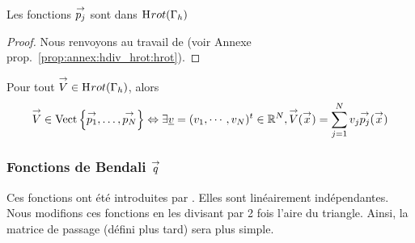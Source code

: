       \begin{prop}
        Les fonctions \({\overset{\rightarrow}{p_j}}\) sont dans \(\mathrm{H}_\mathrm{{}}{rot}(\Gamma_h)\)
      \end{prop}
      \begin{proof}
        Nous renvoyons au travail de \cite{nedelec_mixed_1980} (voir Annexe prop.~\ref{prop:annex:hdiv_hrot:hrot}).
      \end{proof}


      \begin{defn}
        Pour tout \({\overset{\rightarrow}{V}} \in \mathrm{H}_\mathrm{{}}{rot}(\Gamma_h)\), alors
        \begin{equation*}
          {\overset{\rightarrow}{V}} \in \operatorname{Vect}\left\lbrace{\overset{\rightarrow}{p_1}},\ldots,{\overset{\rightarrow}{p_N}}\right\rbrace \Leftrightarrow \exists {\underline{v}} = (v_1,\cdots,v_N)^t \in \mathbb R^N, {\overset{\rightarrow}{V}}({\overset{\rightarrow}{x}}) = \sum_{j=1}^N v_j {\overset{\rightarrow}{p_j}}({\overset{\rightarrow}{x}})
        \end{equation*}
      \end{defn}

    \subsubsection[Fonctions de Bendali q]{Fonctions de Bendali \({\overset{\rightarrow}{q}}\)}

      Ces fonctions ont été introduites par \cite[eq.~28]{bendali_boundary-element_1999}. Elles sont linéairement indépendantes. Nous modifions ces fonctions en les divisant par 2 fois l'aire du triangle. Ainsi, la matrice de passage (défini plus tard) sera plus simple.


